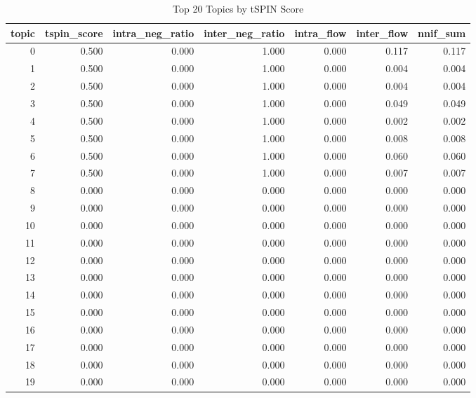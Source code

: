 \begin{table}
\caption{Top 20 Topics by tSPIN Score}
\begin{tabular}{rrrrrrr}
\toprule
topic & tspin_score & intra_neg_ratio & inter_neg_ratio & intra_flow & inter_flow & nnif_sum \\
\midrule
0 & 0.500 & 0.000 & 1.000 & 0.000 & 0.117 & 0.117 \\
1 & 0.500 & 0.000 & 1.000 & 0.000 & 0.004 & 0.004 \\
2 & 0.500 & 0.000 & 1.000 & 0.000 & 0.004 & 0.004 \\
3 & 0.500 & 0.000 & 1.000 & 0.000 & 0.049 & 0.049 \\
4 & 0.500 & 0.000 & 1.000 & 0.000 & 0.002 & 0.002 \\
5 & 0.500 & 0.000 & 1.000 & 0.000 & 0.008 & 0.008 \\
6 & 0.500 & 0.000 & 1.000 & 0.000 & 0.060 & 0.060 \\
7 & 0.500 & 0.000 & 1.000 & 0.000 & 0.007 & 0.007 \\
8 & 0.000 & 0.000 & 0.000 & 0.000 & 0.000 & 0.000 \\
9 & 0.000 & 0.000 & 0.000 & 0.000 & 0.000 & 0.000 \\
10 & 0.000 & 0.000 & 0.000 & 0.000 & 0.000 & 0.000 \\
11 & 0.000 & 0.000 & 0.000 & 0.000 & 0.000 & 0.000 \\
12 & 0.000 & 0.000 & 0.000 & 0.000 & 0.000 & 0.000 \\
13 & 0.000 & 0.000 & 0.000 & 0.000 & 0.000 & 0.000 \\
14 & 0.000 & 0.000 & 0.000 & 0.000 & 0.000 & 0.000 \\
15 & 0.000 & 0.000 & 0.000 & 0.000 & 0.000 & 0.000 \\
16 & 0.000 & 0.000 & 0.000 & 0.000 & 0.000 & 0.000 \\
17 & 0.000 & 0.000 & 0.000 & 0.000 & 0.000 & 0.000 \\
18 & 0.000 & 0.000 & 0.000 & 0.000 & 0.000 & 0.000 \\
19 & 0.000 & 0.000 & 0.000 & 0.000 & 0.000 & 0.000 \\
\bottomrule
\end{tabular}
\end{table}
